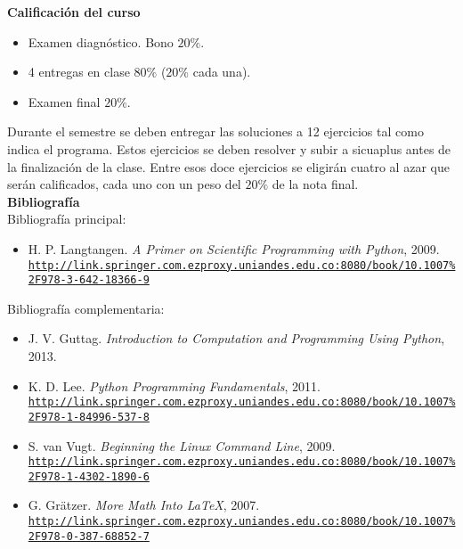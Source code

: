\documentclass[letterpaper,10pt,onecolumn]{article}
\begin{document}
\noindent\textbf{\large {} \quad Calificaci\'on del curso}\\[-0.2cm]

\begin{itemize}
	\item Examen diagnóstico. Bono $20\%$.
	\item 4 entregas en clase $80\%$ ($20\%$ cada una).
	\item Examen final $20\%$.
\end{itemize}
\noindent\normalsize Durante el semestre se deben entregar 
las soluciones a 12 ejercicios tal como indica el programa. 
Estos ejercicios se deben resolver y subir a sicuaplus antes de la
finalizaci\'on de la clase. 
Entre esos doce ejercicios se 
eligirán cuatro al azar que serán calificados, cada uno con un peso del $20\%$
de la nota final. 
\\[0.1cm] 

\noindent\textbf{\large {} \quad Bibliografía}\\[-0.2cm]

\noindent\normalsize Bibliografía principal:


\begin{itemize}
	\item H. P. Langtangen. \textit{A Primer on Scientific Programming with Python}, 2009.\\
	\href{http://link.springer.com.ezproxy.uniandes.edu.co:8080/book/10.1007\%2F978-3-642-18366-9}{\nolinkurl{http://link.springer.com.ezproxy.uniandes.edu.co:8080/book/10.1007\%2F978-3-642-18366-9}}\\[-0.6cm]
\end{itemize}

\noindent\normalsize Bibliografía complementaria:

\begin{itemize}
	\item J. V. Guttag. \textit{Introduction to Computation and Programming Using Python}, 2013.
	\item K. D. Lee. \textit{Python Programming Fundamentals}, 2011. \\
	\href{http://link.springer.com.ezproxy.uniandes.edu.co:8080/book/10.1007\%2F978-1-84996-537-8}{\nolinkurl{http://link.springer.com.ezproxy.uniandes.edu.co:8080/book/10.1007\%2F978-1-84996-537-8}}\\[-0.6cm]
	\item S. van Vugt. \textit{Beginning the Linux Command Line}, 2009.\\
	\href{http://link.springer.com.ezproxy.uniandes.edu.co:8080/book/10.1007\%2F978-1-4302-1890-6}{\nolinkurl{http://link.springer.com.ezproxy.uniandes.edu.co:8080/book/10.1007\%2F978-1-4302-1890-6}}\\[-0.6cm]
	\item G. Gr\"atzer. \textit{More Math Into  \LaTeX}, 2007.\\
	\href{http://link.springer.com.ezproxy.uniandes.edu.co:8080/book/10.1007\%2F978-0-387-68852-7}{\nolinkurl{http://link.springer.com.ezproxy.uniandes.edu.co:8080/book/10.1007\%2F978-0-387-68852-7}}
\end{itemize}
\end{document}
